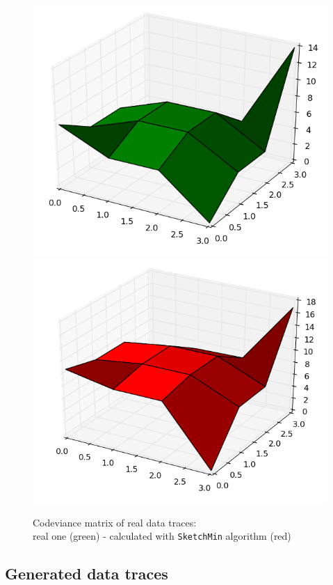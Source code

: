 \documentclass[a4paper]{article}%
\begin{document}
\begin{figure}[H]
	\centering
	\includegraphics[scale=0.35]{realtests_real1.png}
	\includegraphics[scale=0.35]{realtests_sketchmin1.png}
	\caption{Codeviance matrix of real data traces: \\ real one (green) - calculated with \texttt{SketchMin} algorithm (red)}
	\label{ref:exp_real}
\end{figure}


\subsection{Generated data traces}
\end{document}
